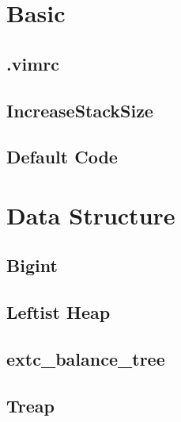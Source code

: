 \documentclass[10pt,twocolumn,oneside]{article}
\begin{document}
\pagestyle{fancy}
\fancyfoot{}
\fancyhead[R]{\thepage}
\renewcommand{\headrulewidth}{0.4pt}
\renewcommand{\contentsname}{Contents} 

\scriptsize
\tableofcontents
\section{Basic}
\subsection{.vimrc}


\newpage

\subsection{IncreaseStackSize}


\subsection{Default Code}

\newpage

\section{Data Structure}
\subsection{Bigint}


\subsection{Leftist Heap}


\newpage

\subsection{extc\_balance\_tree}


\subsection{Treap}

\end{document}
